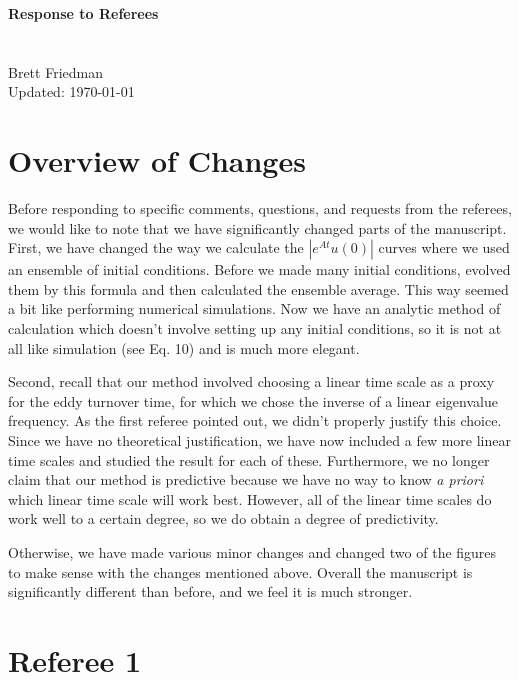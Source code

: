 \documentclass[12pt]{article}
\begin{document}
{\bf Response to Referees \\
 \\
 \\} 
Brett Friedman \\
Updated: \today \\

\hrulefill

\section{Overview of Changes}

Before responding to specific comments, questions, and requests from the referees, we would like to note that we have significantly changed parts of the manuscript. First, we have
changed the way we calculate the $|e^{A t}u(0)|$ curves where we used an ensemble of initial conditions. Before we made many initial conditions, evolved them by this formula and then
calculated the ensemble average. This way seemed a bit like performing numerical simulations. Now we have an analytic method of calculation which doesn't involve setting up any initial
conditions, so it is not at all like simulation (see Eq. 10) and is much more elegant.

Second, recall that our method involved choosing a linear time scale as a proxy for the eddy turnover time, for which we chose the inverse of a linear eigenvalue frequency. 
As the first referee pointed out, we didn't properly justify this choice. Since we have no theoretical justification, 
we have now included a few more linear time scales and studied the result for each of these. Furthermore, we no longer claim that our method
is predictive because we have no way to know \emph{a priori} which linear time scale will work best. However, all of the linear time scales do work well to a certain degree, so
we do obtain a degree of predictivity.

Otherwise, we have made various minor changes and changed two of the figures to make sense with the changes mentioned above. 
Overall the manuscript is significantly different than before, and we feel it is much stronger.


\section{Referee 1}
\end{document}
